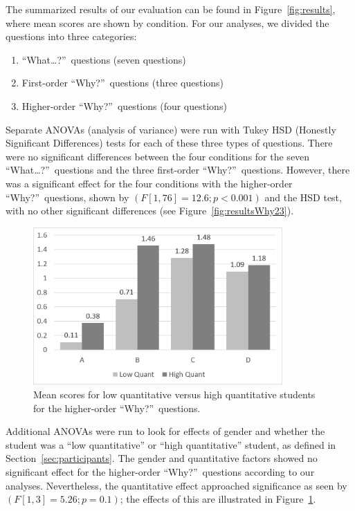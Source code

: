 The summarized results of our evaluation can be found in Figure~\ref{fig:results}, where mean scores are shown by condition.  For our analyses, we divided the questions into three categories:
\begin{enumerate}
\item ``What\ldots?''\ questions (seven questions)
\item First-order ``Why?''\ questions (three questions)
\item Higher-order ``Why?''\ questions (four questions)
\end{enumerate}
Separate ANOVAs (analysis of variance) were run with Tukey HSD (Honestly Significant Differences) tests for each of these three types of questions.  There were no significant differences between the four conditions for the seven ``What\ldots?''\ questions and the three first-order ``Why?''\ questions.    However, there was a significant effect for the four conditions with the higher-order ``Why?''\ questions, shown by $(F[1, 76] = 12.6; p < 0.001)$ and the HSD test, with no other significant differences (see Figure~\ref{fig:resultsWhy23}).

\begin{figure}[h]
	\centering
	\includegraphics[width=0.85\textwidth]{figures/png/results_arts_science.png}
	\caption[Mean scores for low quantitative versus high quantitative students for the higher-order ``Why?''\ questions]{Mean scores for low quantitative versus high quantitative students for the higher-order ``Why?''\ questions.}
	\label{fig:results_arts_science}
\end{figure}

Additional ANOVAs were run to look for effects of gender and whether the student was a ``low quantitative'' or ``high quantitative'' student, as defined in Section~\ref{sec:participants}.  The gender and quantitative factors showed no significant effect for the higher-order ``Why?''\ questions according to our analyses.  Nevertheless, the quantitative effect approached significance as seen by $(F[1, 3] = 5.26; p = 0.1)$; the effects of this are illustrated in Figure~\ref{fig:results_arts_science}.


